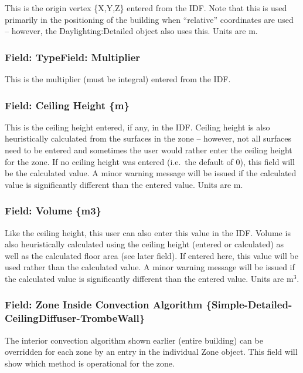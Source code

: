 This is the origin vertex \{X,Y,Z\} entered from the IDF. Note that this is used primarily in the positioning of the building when ``relative'' coordinates are used -- however, the Daylighting:Detailed object also uses this. Units are m.

\subsubsection{Field: TypeField: Multiplier}\label{field-typefield-multiplier}

This is the multiplier (must be integral) entered from the IDF.

\subsubsection{Field: Ceiling Height \{m\}}\label{field-ceiling-height-m}

This is the ceiling height entered, if any, in the IDF. Ceiling height is also heuristically calculated from the surfaces in the zone -- however, not all surfaces need to be entered and sometimes the user would rather enter the ceiling height for the zone. If no ceiling height was entered (i.e.~the default of 0), this field will be the calculated value. A minor warning message will be issued if the calculated value is significantly different than the entered value. Units are m.

\subsubsection{Field: Volume \{m3\}}\label{field-volume-m3}

Like the ceiling height, this user can also enter this value in the IDF. Volume is also heuristically calculated using the ceiling height (entered or calculated) as well as the calculated floor area (see later field). If entered here, this value will be used rather than the calculated value. A minor warning message will be issued if the calculated value is significantly different than the entered value. Units are m\(^{3}\).

\subsubsection{Field: Zone Inside Convection Algorithm \{Simple-Detailed-CeilingDiffuser-TrombeWall\}}\label{field-zone-inside-convection-algorithm-simple-detailed-ceilingdiffuser-trombewall}

The interior convection algorithm shown earlier (entire building) can be overridden for each zone by an entry in the individual Zone object. This field will show which method is operational for the zone.

